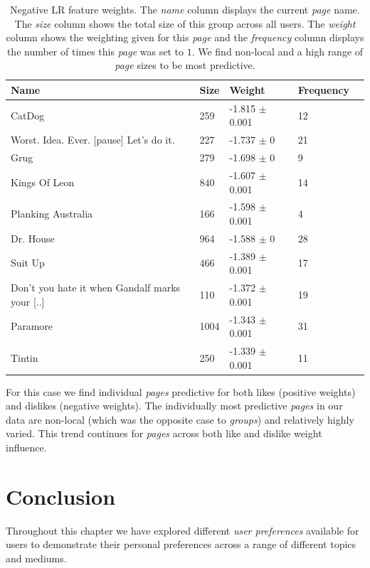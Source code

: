 \begin{table}[h]
\begin{minipage}[b]{1.0\textwidth}
\centering
  \begin{tabular}{|l|l|l|l|l|} %
  \hline
  \textbf{Name} & \textbf{Size} & \textbf{Weight} & \textbf{Frequency} \\ \hline
\small{CatDog}  & 259 & -1.815 $\pm$ 0.001 & 12 \\ \hline
\small{Worst. Idea. Ever. [pause] Let's do it.}  & 227 & -1.737 $\pm$ 0 & 21 \\ \hline
\small{Grug}  & 279 & -1.698 $\pm$ 0 & 9 \\ \hline
\small{Kings Of Leon}  & 840 & -1.607 $\pm$ 0.001 & 14 \\ \hline
\small{Planking Australia}  & 166 & -1.598 $\pm$ 0.001 & 4 \\ \hline
\small{Dr. House}  & 964 & -1.588 $\pm$ 0 & 28 \\ \hline
\small{Suit Up}  & 466 & -1.389 $\pm$ 0.001 & 17 \\ \hline
\small{Don't you hate it when Gandalf marks your [..]}  & 110 & -1.372 $\pm$ 0.001 & 19 \\ \hline
\small{Paramore}  & 1004 & -1.343 $\pm$ 0.001 & 31 \\ \hline
\small{Tintin}  & 250 & -1.339 $\pm$ 0.001 & 11 \\ \hline
  \end{tabular}
 \caption{Negative LR feature weights. The \emph{name} column displays the current \emph{page} name.
  The \emph{size} column shows the total size of this group across all users.
  The \emph{weight} column shows the weighting given for this \emph{page} and the \emph{frequency} column displays the number of times 
  this \emph{page} was set to $1$. We find non-local and a high range of \emph{page} sizes to be most predictive.}
\end{minipage}
\end{table}

For this case we find individual \emph{pages} predictive for both likes (positive weights) and dislikes (negative weights). 
The individually most predictive \emph{pages} in our data are non-local (which was the opposite case to \emph{groups}) and
relatively highly varied. This trend continues for \emph{pages} across both like and dislike weight influence.

\section{Conclusion}
\label{sec:conc}
Throughout this chapter we have explored different \emph{user preferences} available for users to demonstrate their personal preferences across a range of 
different topics and mediums.

